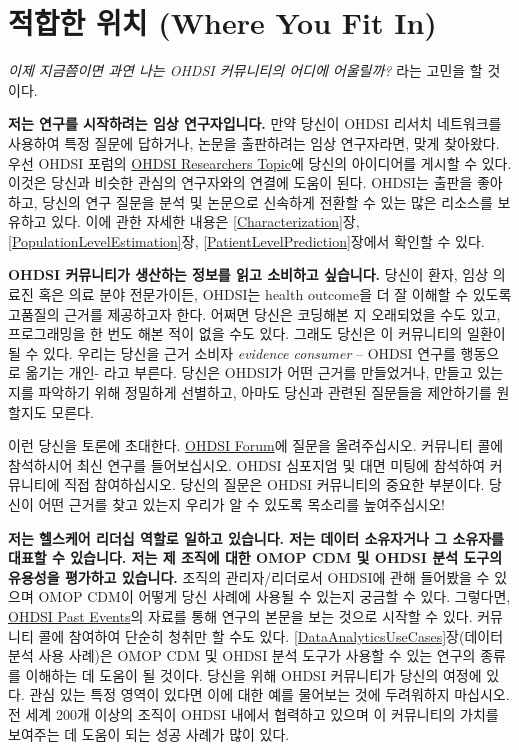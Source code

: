 \documentclass[11pt]{book}
\theoremstyle{definition}
\theoremstyle{definition}
\theoremstyle{definition}
\theoremstyle{remark}
\begin{document}
\section{적합한 위치 (Where You Fit In)}\label{--where-you-fit-in}

\emph{이제 지금쯤이면 과연 나는 OHDSI 커뮤니티의 어디에 어울릴까?} 라는
고민을 할 것이다.

\textbf{저는 연구를 시작하려는 임상 연구자입니다.} 만약 당신이 OHDSI
리서치 네트워크를 사용하여 특정 질문에 답하거나, 논문을 출판하려는 임상
연구자라면, 맞게 찾아왔다. 우선 OHDSI 포럼의
\href{https://forums.ohdsi.org/c/researchers}{OHDSI Researchers Topic}에
당신의 아이디어를 게시할 수 있다. 이것은 당신과 비슷한 관심의 연구자와의
연결에 도움이 된다. OHDSI는 출판을 좋아하고, 당신의 연구 질문을 분석 및
논문으로 신속하게 전환할 수 있는 많은 리소스를 보유하고 있다. 이에 관한
자세한 내용은 \ref{Characterization}장,
\ref{PopulationLevelEstimation}장, \ref{PatientLevelPrediction}장에서
확인할 수 있다.

\textbf{OHDSI 커뮤니티가 생산하는 정보를 읽고 소비하고 싶습니다.} 당신이
환자, 임상 의료진 혹은 의료 분야 전문가이든, OHDSI는 health outcome을 더
잘 이해할 수 있도록 고품질의 근거를 제공하고자 한다. 어쩌면 당신은
코딩해본 지 오래되었을 수도 있고, 프로그래밍을 한 번도 해본 적이 없을
수도 있다. 그래도 당신은 이 커뮤니티의 일환이 될 수 있다. 우리는 당신을
근거 소비자 \emph{evidence consumer} -- OHDSI 연구를 행동으로 옮기는
개인- 라고 부른다. 당신은 OHDSI가 어떤 근거를 만들었거나, 만들고
있는지를 파악하기 위해 정밀하게 선별하고, 아마도 당신과 관련된 질문들을
제안하기를 원할지도 모른다.

이런 당신을 토론에 초대한다. \href{http://forum.ohdsi.org}{OHDSI
Forum}에 질문을 올려주십시오. 커뮤니티 콜에 참석하시어 최신 연구를
들어보십시오. OHDSI 심포지엄 및 대면 미팅에 참석하여 커뮤니티에 직접
참여하십시오. 당신의 질문은 OHDSI 커뮤니티의 중요한 부분이다. 당신이
어떤 근거를 찾고 있는지 우리가 알 수 있도록 목소리를 높여주십시오!

\textbf{저는 헬스케어 리더십 역할로 일하고 있습니다. 저는 데이터
소유자거나 그 소유자를 대표할 수 있습니다. 저는 제 조직에 대한 OMOP CDM
및 OHDSI 분석 도구의 유용성을 평가하고 있습니다.} 조직의 관리자/리더로서
OHDSI에 관해 들어봤을 수 있으며 OMOP CDM이 어떻게 당신 사례에 사용될 수
있는지 궁금할 수 있다. 그렇다면,
\href{https://www.ohdsi.org/past-events/}{OHDSI Past Events}의 자료를
통해 연구의 본문을 보는 것으로 시작할 수 있다. 커뮤니티 콜에 참여하여
단순히 청취만 할 수도 있다. \ref{DataAnalyticsUseCases}장(데이터 분석
사용 사례)은 OMOP CDM 및 OHDSI 분석 도구가 사용할 수 있는 연구의 종류를
이해하는 데 도움이 될 것이다. 당신을 위해 OHDSI 커뮤니티가 당신의 여정에
있다. 관심 있는 특정 영역이 있다면 이에 대한 예를 물어보는 것에
두려워하지 마십시오. 전 세계 200개 이상의 조직이 OHDSI 내에서 협력하고
있으며 이 커뮤니티의 가치를 보여주는 데 도움이 되는 성공 사례가 많이
있다.
\end{document}
